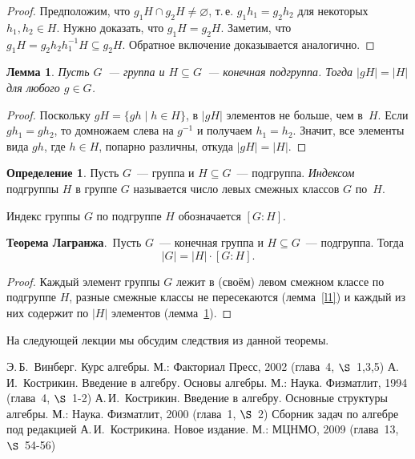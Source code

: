 \documentclass[a4paper,10pt]{amsart}
\newtheorem{lemma}{Лемма}
\theoremstyle{definition}
\newtheorem{definition}{Определение}
\theoremstyle{remark}
\begin{document}
\begin{proof}
Предположим, что $g_1H\cap g_2H\ne\varnothing$, т.\,е.
$g_1h_1=g_2h_2$ для некоторых $h_1,h_2\in H$. Нужно доказать, что
$g_1H=g_2H$. Заметим, что $g_1H=g_2h_2h_1^{-1}H\subseteq g_2H$.
Обратное включение доказывается аналогично.
\end{proof}

\begin{lemma} \label{l2}
Пусть $G$~--- группа и $H\subseteq G$~--- конечная подгруппа. Тогда
$|gH|=|H|$ для любого $g\in G$.
\end{lemma}

\begin{proof}
Поскольку $gH=\{gh \mid h\in H\}$, в $|gH|$ элементов не больше, чем
в~$H$. Если $gh_1=gh_2$, то домножаем слева на $g^{-1}$ и получаем
$h_1=h_2$. Значит, все элементы вида $gh$, где $h\in H$, попарно
различны, откуда $|gH|=|H|$.
\end{proof}

\begin{definition}
Пусть $G$~--- группа и $H\subseteq G$~--- подгруппа. {\it Индексом}
подгруппы $H$ в группе $G$ называется число левых смежных классов
$G$ по~$H$.
\end{definition}

Индекс группы $G$ по подгруппе $H$ обозначается $[G:H]$.

\smallskip

{\bf Теорема Лагранжа}.\ Пусть $G$~--- конечная группа и $H\subseteq
G$~--- подгруппа. Тогда
$$
|G| = |H| \cdot [G:H].
$$

\begin{proof}
Каждый элемент группы $G$ лежит в (своём) левом смежном классе по
подгруппе $H$, разные смежные классы не пересекаются
(лемма~\ref{l1}) и каждый из них содержит по $|H|$ элементов
(лемма~\ref{l2}).
\end{proof}

На следующей лекции мы обсудим следствия из данной теоремы.

\bigskip

\begin{thebibliography}{99}
Э.\,Б.~Винберг. Курс алгебры. М.: Факториал Пресс, 2002 (глава~4,
$\S$~1,3,5)
А.\,И.~Кострикин. Введение в алгебру. Основы алгебры. М.: Наука.
Физматлит, 1994 (глава~4, $\S$~1-2)
А.\,И.~Кострикин. Введение в алгебру. Основные структуры алгебры.
М.: Наука. Физматлит, 2000 (глава~1, $\S$~2)
Сборник задач по алгебре под редакцией А.\,И.~Кострикина. Новое
издание. М.: МЦНМО, 2009 (глава~13, $\S$~54-56)
\end{thebibliography}
\end{document}
